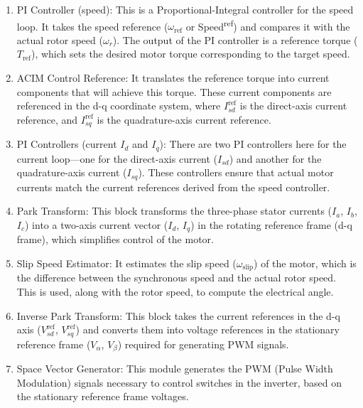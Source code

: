 \begin{enumerate}


  \item {PI Controller (speed):} This is a Proportional-Integral controller for the speed loop. It takes the speed reference ($\omega_{\text{ref}}$ or Speed\textsuperscript{ref}) and compares it with the actual rotor speed ($\omega_r$). The output of the PI controller is a reference torque ($T_{\text{ref}}$), which sets the desired motor torque corresponding to the target speed.
  
  \item {ACIM Control Reference:} It translates the reference torque into current components that will achieve this torque. These current components are referenced in the d-q coordinate system, where $I_{sd}^{\text{ref}}$ is the direct-axis current reference, and $I_{sq}^{\text{ref}}$ is the quadrature-axis current reference.
  
  \item {PI Controllers (current $I_d$ and $I_q$):} There are two PI controllers here for the current loop---one for the direct-axis current ($I_{sd}$) and another for the quadrature-axis current ($I_{sq}$). These controllers ensure that actual motor currents match the current references derived from the speed controller.
  
  \item {Park Transform:} This block transforms the three-phase stator currents ($I_a$, $I_b$, $I_c$) into a two-axis current vector ($I_d$, $I_q$) in the rotating reference frame (d-q frame), which simplifies control of the motor.
  
  \item {Slip Speed Estimator:} It estimates the slip speed ($\omega_{\text{slip}}$) of the motor, which is the difference between the synchronous speed and the actual rotor speed. This is used, along with the rotor speed, to compute the electrical angle.
  
  \item {Inverse Park Transform:} This block takes the current references in the d-q axis ($V_{sd}^{\text{ref}}$, $V_{sq}^{\text{ref}}$) and converts them into voltage references in the stationary reference frame ($V_\alpha$, $V_\beta$) required for generating PWM signals.
  
  \item {Space Vector Generator:} This module generates the PWM (Pulse Width Modulation) signals necessary to control switches in the  
   inverter, based on the stationary reference frame voltages.
  

\end{enumerate}
